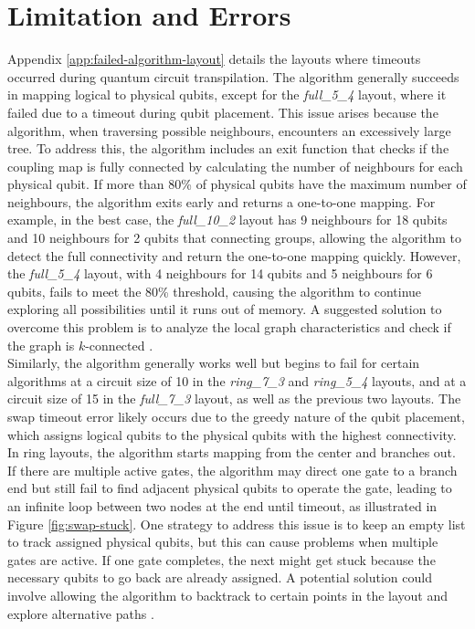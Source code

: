 
\section{Limitation and Errors} %
Appendix \ref{app:failed-algorithm-layout} details the layouts where timeouts occurred during quantum circuit transpilation. The  algorithm generally succeeds in mapping logical to physical qubits, except for the \textit{full\_5\_4} layout, where it failed due to a timeout during qubit placement. This issue arises because the algorithm, when traversing possible neighbours, encounters an excessively large tree. To address this, the algorithm includes an exit function that checks if the coupling map is fully connected by calculating the number of neighbours for each physical qubit. If more than 80\% of physical qubits have the maximum number of neighbours, the algorithm exits early and returns a one-to-one mapping. For example, in the best case, the \textit{full\_10\_2} layout has 9 neighbours for 18 qubits and 10 neighbours for 2 qubits that connecting groups, allowing the algorithm to detect the full connectivity and return the one-to-one mapping quickly. However, the \textit{full\_5\_4} layout, with 4 neighbours for 14 qubits and 5 neighbours for 6 qubits, fails to meet the 80\% threshold, causing the algorithm to continue exploring all possibilities until it runs out of memory. A suggested solution to overcome this problem is to analyze the local graph characteristics and check if the graph is $k$-connected \cite{cornejo_connectivity_2010}. \\
Similarly, the  algorithm generally works well but begins to fail for certain algorithms at a circuit size of 10 in the \textit{ring\_7\_3} and \textit{ring\_5\_4} layouts, and at a circuit size of 15 in the \textit{full\_7\_3} layout, as well as the previous two layouts. The swap timeout error likely occurs due to the greedy nature of the qubit placement, which assigns logical qubits to the physical qubits with the highest connectivity. In ring layouts, the algorithm starts mapping from the center and branches out. If there are multiple active gates, the algorithm may direct one gate to a branch end but still fail to find adjacent physical qubits to operate the gate, leading to an infinite loop between two nodes at the end until timeout, as illustrated in Figure \ref{fig:swap-stuck}. One strategy to address this issue is to keep an empty list to track assigned physical qubits, but this can cause problems when multiple gates are active. If one gate completes, the next might get stuck because the necessary qubits to go back are already assigned. A potential solution could involve allowing the algorithm to backtrack to certain points in the layout and explore alternative paths \cite{parizek_fast_2019}.
